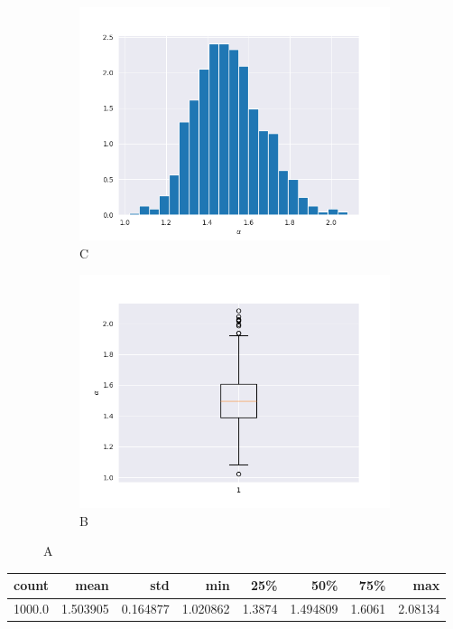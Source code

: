 \documentclass{article}
\begin{document}
		\begin{figure}[H]
			\begin{subfigure}{.5\textwidth}
				\centering
				\includegraphics[width=1\linewidth]{images/cdf_alpha_hist.png}
				\caption{C}
			\end{subfigure}
			\begin{subfigure}[r]{.5\textwidth}
				\centering
				\includegraphics[width=1\linewidth]{images/cdf_alpha_boxplot.png}
				\caption{B}\label{alpha1}
			\end{subfigure}
			\caption{A}
		\end{figure}

		\begin{tabular}[H]{|r|r|r|r|r|r|r|r|}
			\hline
			count &      mean &       std &       min &     25\% &       50\% &     75\% &      max \\\hline
			1000.0 &  1.503905 &  0.164877 &  1.020862 &  1.3874 &  1.494809 &  1.6061 &  2.08134 \\\hline
		\end{tabular}
\end{document}
